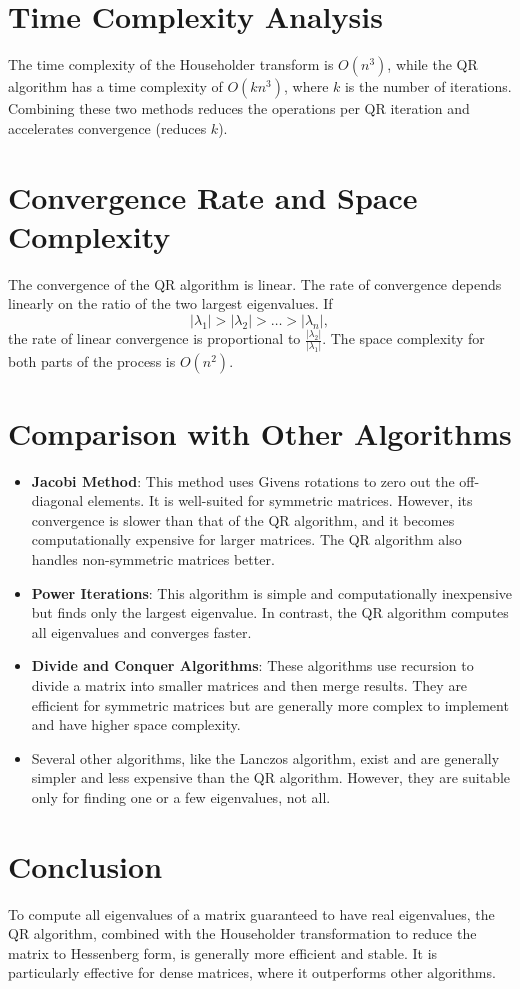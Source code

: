 \documentclass[12pt,letterpaper, onecolumn]{exam}
\begin{document}
\section{Time Complexity Analysis}
The time complexity of the Householder transform is $O(n^3)$, while the QR algorithm has a time complexity of $O(kn^3)$, where $k$ is the number of iterations. Combining these two methods reduces the operations per QR iteration and accelerates convergence (reduces $k$).

\section{Convergence Rate and Space Complexity}
The convergence of the QR algorithm is linear. The rate of convergence depends linearly on the ratio of the two largest eigenvalues. If 
\[
|\lambda_1| > |\lambda_2| > \dots > |\lambda_n|,
\]
the rate of linear convergence is proportional to $\frac{|\lambda_2|}{|\lambda_1|}$. The space complexity for both parts of the process is $O(n^2)$.

\section{Comparison with Other Algorithms}
\begin{itemize}
    \item \textbf{Jacobi Method}: This method uses Givens rotations to zero out the off-diagonal elements. It is well-suited for symmetric matrices. However, its convergence is slower than that of the QR algorithm, and it becomes computationally expensive for larger matrices. The QR algorithm also handles non-symmetric matrices better.
    \item \textbf{Power Iterations}: This algorithm is simple and computationally inexpensive but finds only the largest eigenvalue. In contrast, the QR algorithm computes all eigenvalues and converges faster.
    \item \textbf{Divide and Conquer Algorithms}: These algorithms use recursion to divide a matrix into smaller matrices and then merge results. They are efficient for symmetric matrices but are generally more complex to implement and have higher space complexity.
    \item Several other algorithms, like the Lanczos algorithm, exist and are generally simpler and less expensive than the QR algorithm. However, they are suitable only for finding one or a few eigenvalues, not all.
\end{itemize}

\section{Conclusion}
To compute all eigenvalues of a matrix guaranteed to have real eigenvalues, the QR algorithm, combined with the Householder transformation to reduce the matrix to Hessenberg form, is generally more efficient and stable. It is particularly effective for dense matrices, where it outperforms other algorithms.
\end{document}
